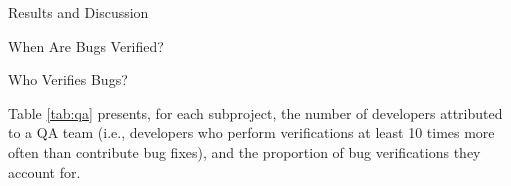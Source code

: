 \begin{section}{Results and Discussion}
\begin{subsection}{When Are Bugs Verified?}
	
	
	
	
	
	
	
	
\end{subsection}

\begin{subsection}{Who Verifies Bugs?}

	Table \ref{tab:qa} presents, for each subproject, the number of developers attributed to a QA team (i.e., developers who perform verifications at least 10 times more often than contribute bug fixes), and the proportion of bug verifications they account for.
	\newcommand\MyHead[2]{%
	  \multicolumn{1}{l}{\parbox{#1}{\centering #2}}
	}
	

\end{subsection}
\end{section}
